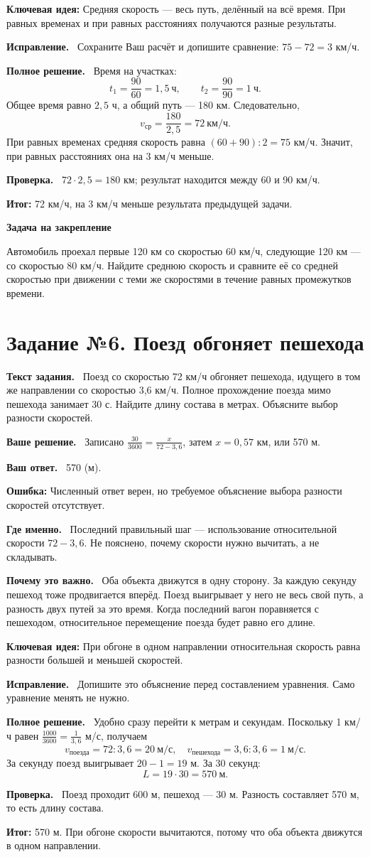 \documentclass[a4paper,12pt]{article}
\newcommand{\task}[2]{\clearpage\phantomsection\label{task:#1}\section*{\textcolor{darkaccent}{Задание №#1. #2}}}
\newcommand{\parthead}[1]{\par\textbf{#1.}\ }
\newcommand{\error}[1]{\par\textcolor{red!75!black}{\textbf{Ошибка:}} #1\par}
\newcommand{\idea}[1]{\par\textcolor{blue!60!black}{\textbf{Ключевая идея:}} #1\par}
\newcommand{\result}[1]{\par\textcolor{darkaccent}{\textbf{Итог:}} #1\par}
\newcommand{\practice}[1]{\par\medskip\textcolor{accent}{\textbf{Задача на закрепление}}\par #1}
\begin{document}
\idea{Средняя скорость --- весь путь, делённый на всё время. При равных временах и при равных расстояниях получаются разные результаты.}
\parthead{Исправление} Сохраните Ваш расчёт и допишите сравнение: $75-72=3$ км/ч.
\parthead{Полное решение} Время на участках:
\[t_1=\frac{90}{60}=1{,}5\ \text{ч},\qquad t_2=\frac{90}{90}=1\ \text{ч}.\]
Общее время равно $2{,}5$ ч, а общий путь --- 180 км. Следовательно,
\[v_{\text{ср}}=\frac{180}{2{,}5}=72\ \text{км/ч}.\]
При равных временах средняя скорость равна $(60+90):2=75$ км/ч. Значит, при равных расстояниях она на 3 км/ч меньше.
\parthead{Проверка} $72\cdot2{,}5=180$ км; результат находится между 60 и 90 км/ч.
\result{72 км/ч, на 3 км/ч меньше результата предыдущей задачи.}
\practice{Автомобиль проехал первые 120 км со скоростью 60 км/ч, следующие 120 км --- со скоростью 80 км/ч. Найдите среднюю скорость и сравните её со средней скоростью при движении с теми же скоростями в течение равных промежутков времени.}
\task{6}{Поезд обгоняет пешехода}
\parthead{Текст задания} Поезд со скоростью 72 км/ч обгоняет пешехода, идущего в том же направлении со скоростью 3,6 км/ч. Полное прохождение поезда мимо пешехода занимает 30 с. Найдите длину состава в метрах. Объясните выбор разности скоростей.
\parthead{Ваше решение} Записано $\frac{30}{3600}=\frac{x}{72-3{,}6}$, затем $x=0{,}57$ км, или 570 м.
\parthead{Ваш ответ} 570 (м).
\error{Численный ответ верен, но требуемое объяснение выбора разности скоростей отсутствует.}
\parthead{Где именно} Последний правильный шаг --- использование относительной скорости $72-3{,}6$. Не пояснено, почему скорости нужно вычитать, а не складывать.
\parthead{Почему это важно} Оба объекта движутся в одну сторону. За каждую секунду пешеход тоже продвигается вперёд. Поезд выигрывает у него не весь свой путь, а разность двух путей за это время. Когда последний вагон поравняется с пешеходом, относительное перемещение поезда будет равно его длине.
\idea{При обгоне в одном направлении относительная скорость равна разности большей и меньшей скоростей.}
\parthead{Исправление} Допишите это объяснение перед составлением уравнения. Само уравнение менять не нужно.
\parthead{Полное решение} Удобно сразу перейти к метрам и секундам. Поскольку 1 км/ч равен $\frac{1000}{3600}=\frac1{3{,}6}$ м/с, получаем
\[v_{\text{поезда}}=72:3{,}6=20\ \text{м/с},\quad v_{\text{пешехода}}=3{,}6:3{,}6=1\ \text{м/с}.\]
За секунду поезд выигрывает $20-1=19$ м. За 30 секунд:
\[L=19\cdot30=570\ \text{м}.\]
\parthead{Проверка} Поезд проходит 600 м, пешеход --- 30 м. Разность составляет 570 м, то есть длину состава.
\result{570 м. При обгоне скорости вычитаются, потому что оба объекта движутся в одном направлении.}
\end{document}

